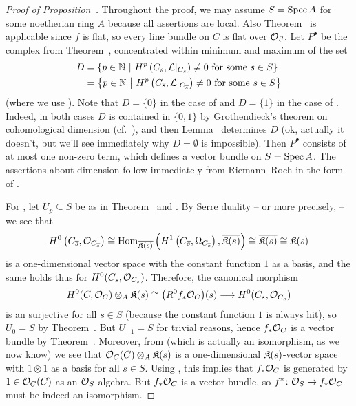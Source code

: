 \documentclass[a4paper,parskip=half,numbers=enddot, DIV=12]{scrreprt}
\begin{document}
\begin{proof}[Proof of Proposition~]
	Throughout the proof, we may assume $S=\operatorname{Spec} A$ for some noetherian ring $A$ because all assertions are local. Also Theorem~ is applicable since $f$ is flat, so every line bundle on $C$ is flat over $\mathcal{O}_S$. Let $P^\bullet$ be the complex from Theorem~, concentrated within minimum and maximum of the set
	\begin{align*}
		D&=\left\{p\in\mathbb{N}\ \middle|\  H^p\left(C_s,\mathcal{L}|_{C_s}\right)\neq 0\text{ for some }s\in S\right\}\\
		&=\left\{p\in\mathbb{N}\ \middle|\  H^p\left(C_{\overline{s}},\mathcal{L}|_{C_{\overline{s}}}\right)\neq 0\text{ for some }s\in S\right\}
	\end{align*}
	(where we use ). Note that $D=\{0\}$ in the case of  and $D=\{1\}$ in the case of . Indeed, in both cases $D$ is contained in $\{0,1\}$ by Grothendieck's theorem on cohomological dimension (cf.\ \cite[Proposition~1.4.1]{alggeo2}), and then Lemma~ determines $D$ (ok, actually it doesn't, but we'll see immediately why $D=\emptyset$ is impossible). Then $P^\bullet$ consists of at most one non-zero term, which defines a vector bundle on $S=\operatorname{Spec} A$. The assertions about dimension follow immediately from Riemann--Roch in the form of \cite[equation~(3.1.3)]{alggeo2}.
	
	For , let $U_p\subseteq S$ be as in Theorem~ and . By Serre duality -- or more precisely, \cite[Theorem~7 and ]{alggeo2} -- we see that
	\begin{align*}
		H^0\left(C_{\overline{s}},\mathcal{O}_{C_{\overline{s}}}\right)\cong \operatorname{Hom}_{\overline{\mathfrak{K}(s)}}\left(H^1\left(C_{\overline{s}},\Omega_{C_{\overline{c}}}\right),\overline{\mathfrak{K}(s)}\right)\cong\overline{\mathfrak{K}(s)}\cong \mathfrak{K}(s)
	\end{align*}
	is a one-dimensional vector space with the constant function $1$ as a basis, and the same holds thus for $H^0(C_s,\mathcal{O}_{C_s})$. Therefore, the canonical morphism
	\begin{align}\lbl{eq:H0OC}
		H^0(C,\Oo_C)\otimes_A\KK(s)\cong\big(R^0f_*\Oo_C\big)(s)\morphism H^0(C_s,\Oo_{C_s})
	\end{align}
	is an surjective for all $s\in S$ (because the constant function $1$ is always hit), so $U_0=S$ by Theorem~. But $U_{-1}=S$ for trivial reasons, hence $f_*\mathcal{O}_C$ is a vector bundle by Theorem~. Moreover, from  (which is actually an isomorphism, as we now know) we see that $\mathcal{O}_C(C)\otimes_A\mathfrak{K}(s)$ is a one-dimensional $\mathfrak{K}(s)$-vector space with $1\otimes 1$ as a basis for all $s\in S$. Using \cite[Lemma~1.5.1]{alg2}, this implies that $f_*\mathcal{O}_C$ is generated by $1\in\mathcal{O}_C(C)$ as an $\mathcal{O}_S$-algebra. But $f_*\mathcal{O}_C$ is a vector bundle, so $f^*\colon \Oo_S\morphism f_*\Oo_C$ must be indeed an isomorphism.
	

\end{proof}
\end{document}
